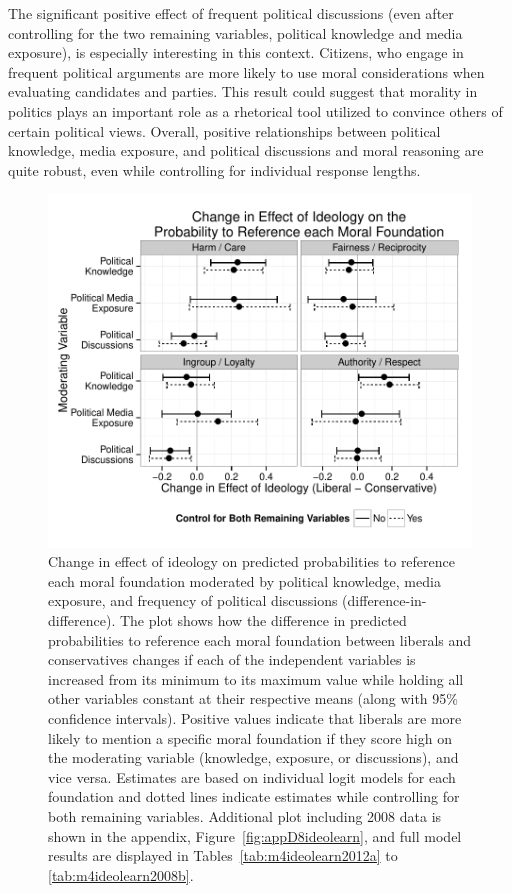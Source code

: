 \documentclass[12pt]{article}
\begin{document}
The significant positive effect of frequent political discussions (even after controlling for the two remaining variables, political knowledge and media exposure), is especially interesting in this context. Citizens, who engage in frequent political arguments are more likely to use moral considerations when evaluating candidates and parties. This result could suggest that morality in politics plays an important role as a rhetorical tool utilized to convince others of certain political views. Overall, positive relationships between political knowledge, media exposure, and political discussions and moral reasoning are quite robust, even while controlling for individual response lengths.

\begin{figure}[h]\centering
\includegraphics[scale=.9]{../calc/fig/fig4ideolearn.pdf}
\caption{Change in effect of ideology on predicted probabilities to reference each moral foundation moderated by political knowledge, media exposure, and frequency of political discussions (difference-in-difference). The plot shows how the difference in predicted probabilities to reference each moral foundation between liberals and conservatives changes if each of the independent variables is increased from its minimum to its maximum value while holding all other variables constant at their respective means (along with 95\% confidence intervals). Positive values indicate that liberals are more likely to mention a specific moral foundation if they score high on the moderating variable (knowledge, exposure, or discussions), and vice versa. Estimates are based on individual logit models for each foundation and dotted lines indicate estimates while controlling for both remaining variables. Additional plot including 2008 data is shown in the appendix, Figure~\ref{fig:appD8ideolearn}, and full model results are displayed in Tables~\ref{tab:m4ideolearn2012a} to \ref{tab:m4ideolearn2008b}.}\label{fig:4ideolearn}
\end{figure}
\clearpage
\end{document}

